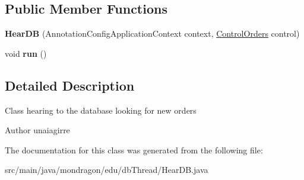 \subsection*{Public Member Functions}
\begin{DoxyCompactItemize}
\item 
\mbox{\label{classmondragon_1_1edu_1_1db_thread_1_1_hear_d_b_a5d6d28669c13c19211fe6cdadc2513e3}} 
{\bfseries Hear\+DB} (Annotation\+Config\+Application\+Context context, \mbox{\hyperlink{classmondragon_1_1edu_1_1control_1_1_control_orders}{Control\+Orders}} control)
\item 
\mbox{\label{classmondragon_1_1edu_1_1db_thread_1_1_hear_d_b_a3d256527dce696d9e277c33e12a3e507}} 
void {\bfseries run} ()
\end{DoxyCompactItemize}


\subsection{Detailed Description}
Class hearing to the database looking for new orders

\begin{DoxyAuthor}{Author}
unaiagirre 
\end{DoxyAuthor}


The documentation for this class was generated from the following file\+:\begin{DoxyCompactItemize}
\item 
src/main/java/mondragon/edu/db\+Thread/Hear\+D\+B.\+java\end{DoxyCompactItemize}
